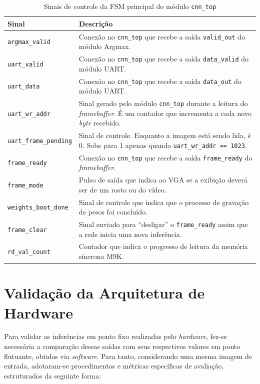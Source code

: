 \begin{table}[H]
\centering
\caption{Sinais de controle da FSM principal do módulo \texttt{cnn\_top}}
\label{tab:sinais_fsm_controle}
\small
\begin{tabularx}{\textwidth}{l X}
\toprule
\textbf{Sinal} & \textbf{Descrição} \\
\midrule
\texttt{argmax\_valid} & Conexão no \texttt{cnn\_top} que recebe a saída \texttt{valid\_out} do módulo Argmax. \\
\texttt{uart\_valid} & Conexão no \texttt{cnn\_top} que recebe a saída \texttt{data\_valid} do módulo UART. \\
\texttt{uart\_data} & Conexão no \texttt{cnn\_top} que recebe a saída \texttt{data\_out} do módulo UART. \\
\texttt{uart\_wr\_addr} & Sinal gerado pelo módulo \texttt{cnn\_top} durante a leitura do \textit{framebuffer}. É um contador que incrementa a cada novo \textit{byte} recebido. \\
\texttt{uart\_frame\_pending} & Sinal de controle. Enquanto a imagem está sendo lida, é 0. Sobe para 1 apenas quando \texttt{uart\_wr\_addr == 1023}. \\
\texttt{frame\_ready} & Conexão no \texttt{cnn\_top} que recebe a saída \texttt{frame\_ready} do \textit{framebuffer}. \\
\texttt{frame\_mode} & Pulso de saída que indica ao VGA se a exibição deverá ser de um rosto ou do vídeo. \\
\texttt{weights\_boot\_done} & Sinal de controle que indica que o processo de gravação de pesos foi concluído. \\
\texttt{frame\_clear} & Sinal enviado para ``desligar'' o \texttt{frame\_ready} assim que a rede inicia uma nova inferência. \\
\texttt{rd\_val\_count} & Contador que indica o progresso de leitura da memória síncrona M9K. \\
\bottomrule
\end{tabularx}
\end{table}

\section{Validação da Arquitetura de Hardware}

Para validar as inferências em ponto fixo realizadas pelo \textit{hardware}, fez-se necessária a comparação dessas saídas com seus respectivos valores em ponto flutuante, obtidos via \textit{software}. Para tanto, considerando uma mesma imagem de entrada, adotaram-se procedimentos e métricas específicas de avaliação, estruturados da seguinte forma:

